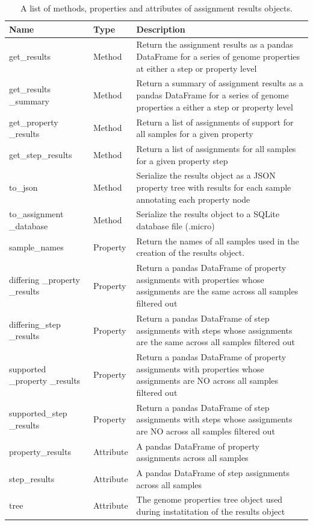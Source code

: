 \begin{longtable}{|p{2.7cm}|p{2cm}|p{10cm}|}
\caption{A list of methods, properties and attributes of assignment results objects.}
\label{tab:results-object}\\
\hline
\textbf{Name} & \textbf{Type} & \textbf{Description} \\ \hline
\endfirsthead
%
\endhead
%
get\_results & Method & Return the assignment results as a pandas DataFrame for a series of genome properties at either a step or property level \\ \hline
get\_results \_summary & Method & Return a summary of assignment results as a pandas DataFrame for a series of genome properties a either a step or property level \\ \hline
get\_property \_results & Method & Return a list of assignments of support for all samples for a given property \\ \hline
get\_step\_results & Method & Return a list of assignments for all samples for a given property step \\ \hline
to\_json & Method & Serialize the results object as a JSON property tree with results for each sample annotating each property node \\ \hline
to\_assignment \_database & Method & Serialize the results object to a SQLite database file (.micro) \\ \hline
sample\_names & Property & Return the names of all samples used in the creation of the results object. \\ \hline
differing \_property \_results & Property & Return a pandas DataFrame of property assignments with properties whose assignments are the same across all samples filtered out \\ \hline
differing\_step \_results & Property & Return a pandas DataFrame of step assignments with steps whose assignments are the same across all samples filtered out \\ \hline
supported \_property \_results & Property & Return a pandas DataFrame of property assignments with properties whose assignments are NO across all samples filtered out \\ \hline
supported\_step \_results & Property & Return a pandas DataFrame of step assignments with steps whose assignments are NO across all samples filtered out \\ \hline
property\_results & Attribute & A pandas DataFrame of property assignments across all samples \\ \hline
step\_results & Attribute & A pandas DataFrame of step assignments across all samples \\ \hline
tree & Attribute & The genome properties tree object used during instatitation of the results object \\ \hline
\end{longtable}

